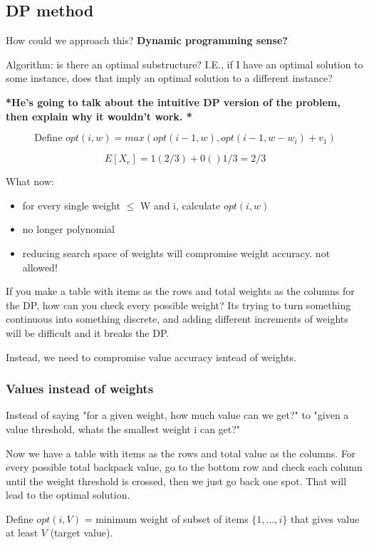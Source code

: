 \documentclass[11pt]{article}
\begin{document}
\subsection{DP method}
\label{sec:orgde1c9af}

How could we approach this? \textbf{\textbf{Dynamic programming sense?}}

Algorithm: is there an optimal substructure? I.E., if I have an optimal solution to some instance, does that imply an optimal solution to a different instance? 

\textbf{*He's going to talk about the intuitive DP version of the problem, then explain why it wouldn't work. *}

\[ \text{Define } opt(i,w) = max\left( opt(i-1, w) , opt (i-1, w-w_i) + v_1 \right) \]

\[ E[X_e] = 1(2/3) + 0()1/3 = 2/3 \]

What now:
\begin{itemize}
\item for every single weight \(\le\) W and i, calculate \(opt(i,w)\)
\item no longer polynomial
\item reducing search space of weights will compromise weight accuracy. not allowed!
\end{itemize}

If you make a table with items as the rows and total weights as the columns for the DP, how can you check every possible weight? Its trying to turn something continuous into something discrete, and adding different increments of weights will be difficult and it breaks the DP.

Instead, we need to compromise value accuracy isntead of weights.

\subsubsection{Values instead of weights}
\label{sec:orgedd883e}

Instead of saying "for a given weight, how much value can we get?" to "given a value threshold, whats the smallest weight i can get?"

Now we have a table with items as the rows and total value as the columns. For every possible total backpack value, go to the bottom row and check each column until the weight threshold is crossed, then we just go back one spot. That will lead to the optimal solution.

Define \(opt(i,V)\) = minimum weight of subset of items \(\{1, \ldots, i\}\) that gives value at least \(V\) (target value).
\end{document}
